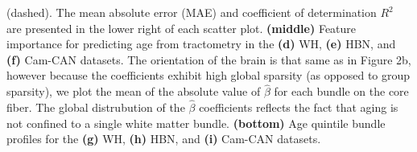 \documentclass[a0paper,landscape,fontscale=0.395]{baposter}
\newenvironment{Figure}
  {\par\medskip\noindent\minipage{\linewidth}}
  {\endminipage\par\medskip}
\begin{document}
\begin{poster}
{\begin{Figure}
{        (dashed). The mean absolute error (MAE) and coefficient of
        determination $R^2$ are presented in the lower right of each scatter
        plot.
        {\bf (middle)} Feature importance for predicting age from tractometry in
        the {\bf (d)} WH, {\bf (e)} HBN, and {\bf (f)} Cam-CAN datasets.
        The orientation of the
        brain is that same as in Figure 2b, however because
        the coefficients exhibit high global sparsity (as opposed to group
        sparsity), we plot the mean of the absolute value of $\hat{\beta}$
        for each bundle on the core fiber. The global distrubution of the
        $\hat{\beta}$ coefficients reflects the fact that aging is not
        confined to a single white matter bundle.
        {\bf (bottom)} Age quintile bundle profiles for the {\bf (g)} WH,
        {\bf (h)} HBN, and {\bf (i)} Cam-CAN datasets.
    }
\end{Figure}
}


\end{poster}
\end{document}
